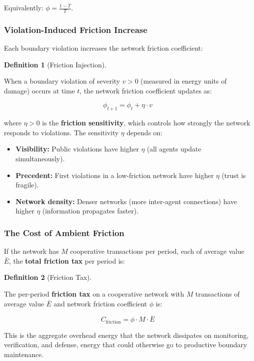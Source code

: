 \documentclass[11pt]{article}
\theoremstyle{plain}
\theoremstyle{definition}
\newtheorem{definition}{Definition}
\theoremstyle{remark}
\let\origsubsubsection\subsubsection
\renewcommand{\subsubsection}{\needspace{4\baselineskip}\origsubsubsection}
\begin{document}
Equivalently: \(\phi = \frac{1 - T}{T}\).

\subsubsection{Violation-Induced Friction
Increase}\label{violation-induced-friction-increase}

Each boundary violation increases the network friction coefficient:

\begin{definition}[Friction Injection]
\label{def-friction-injection}

When a boundary violation of severity $v > 0$ (measured in energy units of damage) occurs at time $t$, the network friction coefficient updates as:

$$\phi_{t+1} = \phi_t + \eta \cdot v$$

where $\eta > 0$ is the \textbf{friction sensitivity}, which controls how strongly the network responds to violations. The sensitivity $\eta$ depends on:
\begin{itemize}
\item \textbf{Visibility:} Public violations have higher $\eta$ (all agents update simultaneously).
\item \textbf{Precedent:} First violations in a low-friction network have higher $\eta$ (trust is fragile).
\item \textbf{Network density:} Denser networks (more inter-agent connections) have higher $\eta$ (information propagates faster).
\end{itemize}

\end{definition}

\subsubsection{The Cost of Ambient
Friction}\label{the-cost-of-ambient-friction}

If the network has \(M\) cooperative transactions per period, each of
average value \(\bar{E}\), the \textbf{total friction tax} per period
is:

\begin{definition}[Friction Tax]
\label{def-friction-tax}

The per-period \textbf{friction tax} on a cooperative network with $M$ transactions of average value $\bar{E}$ and network friction coefficient $\phi$ is:

$$C_{\text{friction}} = \phi \cdot M \cdot \bar{E}$$

This is the aggregate overhead energy that the network dissipates on monitoring, verification, and defense, energy that could otherwise go to productive boundary maintenance.
\end{definition}
\end{document}
